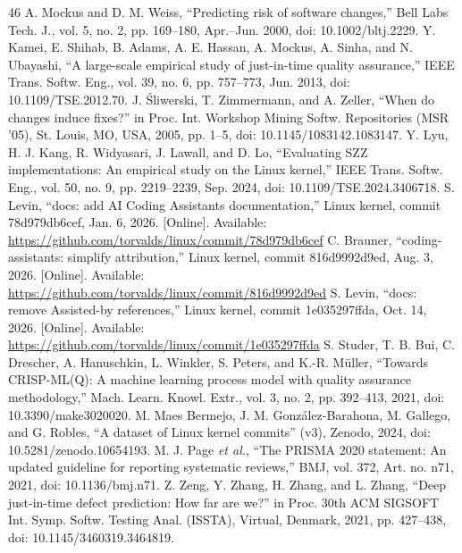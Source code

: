 \begin{thebibliography}{46}
 A. Mockus and D. M. Weiss, ``Predicting risk of software changes,'' Bell Labs Tech. J., vol. 5, no. 2, pp. 169--180, Apr.--Jun. 2000, doi: \mbox{10.1002/bltj.2229}.
 Y. Kamei, E. Shihab, B. Adams, A. E. Hassan, A. Mockus, A. Sinha, and N. Ubayashi, ``A large-scale empirical study of just-in-time quality assurance,'' IEEE Trans. Softw. Eng., vol. 39, no. 6, pp. 757--773, Jun. 2013, doi: \mbox{10.1109/TSE.2012.70}.
 J. Śliwerski, T. Zimmermann, and A. Zeller, ``When do changes induce fixes?'' in Proc. Int. Workshop Mining Softw. Repositories (MSR '05), St. Louis, MO, USA, 2005, pp. 1--5, doi: \mbox{10.1145/1083142.1083147}.
 Y. Lyu, H. J. Kang, R. Widyasari, J. Lawall, and D. Lo, ``Evaluating SZZ implementations: An empirical study on the Linux kernel,'' IEEE Trans. Softw. Eng., vol. 50, no. 9, pp. 2219--2239, Sep. 2024, doi: \mbox{10.1109/TSE.2024.3406718}.
 S. Levin, ``docs: add AI Coding Assistants documentation,'' Linux kernel, commit 78d979db6cef, Jan. 6, 2026. [Online]. Available: \url{https://github.com/torvalds/linux/commit/78d979db6cef}
 C. Brauner, ``coding-assistants: simplify attribution,'' Linux kernel, commit 816d9992d9ed, Aug. 3, 2026. [Online]. Available: \url{https://github.com/torvalds/linux/commit/816d9992d9ed}
 S. Levin, ``docs: remove Assisted-by references,'' Linux kernel, commit 1e035297ffda, Oct. 14, 2026. [Online]. Available: \url{https://github.com/torvalds/linux/commit/1e035297ffda}
 S. Studer, T. B. Bui, C. Drescher, A. Hanuschkin, L. Winkler, S. Peters, and K.-R. M\"uller, ``Towards CRISP-ML(Q): A machine learning process model with quality assurance methodology,'' Mach. Learn. Knowl. Extr., vol. 3, no. 2, pp. 392--413, 2021, doi: 10.3390/make3020020.
 M. Maes Bermejo, J. M. González-Barahona, M. Gallego, and G. Robles, ``A dataset of Linux kernel commits'' (v3), Zenodo, 2024, doi: 10.5281/zenodo.10654193.
 M. J. Page \emph{et al.}, ``The PRISMA 2020 statement: An updated guideline for reporting systematic reviews,'' BMJ, vol. 372, Art. no. n71, 2021, doi: 10.1136/bmj.n71.
 Z. Zeng, Y. Zhang, H. Zhang, and L. Zhang, ``Deep just-in-time defect prediction: How far are we?'' in Proc. 30th ACM SIGSOFT Int. Symp. Softw. Testing Anal. (ISSTA), Virtual, Denmark, 2021, pp. 427--438, doi: \mbox{10.1145/3460319.3464819}.

\end{thebibliography}
